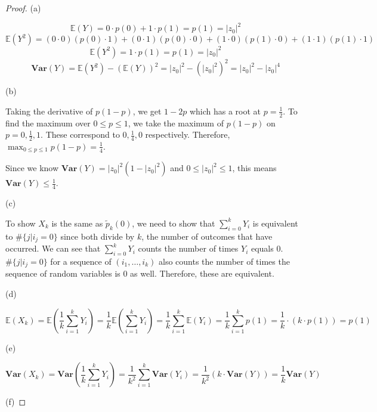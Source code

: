 \begin{proof}
	(a)

\[ \mathbb{E}(Y) = 0 \cdot p(0) + 1 \cdot p(1) = p(1) = |z_0|^2 \]
\[ \mathbb{E}(Y^2) = (0 \cdot 0) (p(0) \cdot 1) + (0 \cdot 1) (p(0) \cdot 0) + (1 \cdot 0) (p(1) \cdot 0) + (1 \cdot 1) (p(1) \cdot 1) \]
\[ \mathbb{E}(Y^2) = 1 \cdot p(1) = p(1) = |z_0|^2 \]
\[ \textbf{Var}(Y) = \mathbb{E}(Y^2) - (\mathbb{E}(Y))^2 = |z_0|^2 - \left(|z_0|^2\right)^2 = |z_0|^2 - |z_0|^4 \]

(b)

Taking the derivative of \(p(1-p)\), we get \(1 - 2p\) which has a root at \(p=\frac{1}{2}\). To find the maximum over \(0 \leq p \leq 1\), we take the maximum of \(p(1-p)\) on \(p = 0, \frac{1}{2}, 1\). These correspond to \(0, \frac{1}{4}, 0\) respectively. Therefore, \(\max_{0 \leq p \leq 1}p(1-p) = \frac{1}{4}\).

Since we know \(\textbf{Var}(Y) = |z_0|^2(1 - |z_0|^2)\) and \(0 \leq |z_0|^2 \leq 1\), this means \(\textbf{Var}(Y) \leq \frac{1}{4}\).

(c)

To show \(X_k\) is the same as \(\tilde{p}_k(0)\), we need to show that \(\sum_{i=0}^k Y_i\) is equivalent to \(\#\{j | i_j = 0\}\) since both divide by \(k\), the number of outcomes that have occurred. We can see that \(\sum_{i=0}^k Y_i\) counts the number of times \(Y_i\) equals 0. \(\#\{j | i_j = 0\}\) for a sequence of \((i_1, \dotsc, i_k)\) also counts the number of times the sequence of random variables is 0 as well. Therefore, these are equivalent.

(d)

\[ \mathbb{E}(X_k) = \mathbb{E}\left(\frac{1}{k} \sum_{i=1}^k Y_i\right) = \frac{1}{k} \mathbb{E}\left(\sum_{i=1}^k Y_i\right) = \frac{1}{k} \sum_{i=1}^k \mathbb{E}\left(Y_i\right) = \frac{1}{k} \sum_{i=1}^k p(1) = \frac{1}{k} \cdot (k \cdot p(1)) = p(1) \]

(e)

\[ \textbf{Var}\left(X_k\right) = \textbf{Var}\left(\frac{1}{k} \sum_{i=1}^k Y_i\right) = \frac{1}{k^2} \sum_{i=1}^k \textbf{Var}\left(Y_i\right) = \frac{1}{k^2} (k \cdot \textbf{Var}(Y)) = \frac{1}{k} \textbf{Var}(Y) \]

(f)


\end{proof}
